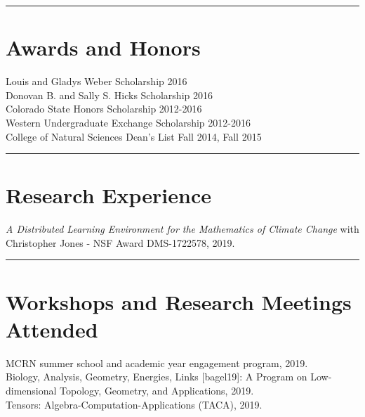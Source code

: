 \documentclass[12pt]{article} %
\begin{document}
\rule{\textwidth}{0.5mm}


\section{Awards and Honors}
\begin{flushleft}
Louis and Gladys Weber Scholarship \hfill 2016\\
\vspace*{5pt}
Donovan B. and Sally S. Hicks Scholarship \hfill 2016\\
\vspace*{5pt}
Colorado State Honors Scholarship \hfill 2012-2016\\
\vspace*{5pt}
Western Undergraduate Exchange Scholarship \hfill 2012-2016\\
\vspace*{5pt}
College of Natural Sciences Dean's List \hfill Fall 2014, Fall 2015\\
\vspace*{5pt}
\end{flushleft}
\rule{\textwidth}{0.5mm}

\section{Research Experience}
\begin{flushleft}
    \emph{A Distributed Learning Environment for the Mathematics of Climate Change} with Christopher Jones - NSF Award DMS-1722578, 2019.
\end{flushleft}
\rule{\textwidth}{0.5mm}

\section{Workshops and Research Meetings Attended}

\begin{flushleft}
MCRN summer school and academic year engagement program, 2019.\\
\vspace*{5pt}
Biology, Analysis, Geometry, Energies, Links [bagel19]: A Program on Low-dimensional Topology, Geometry, and Applications, 2019.\\
\vspace*{5pt}
Tensors: Algebra-Computation-Applications (TACA), 2019.\\
\end{flushleft}
\end{document}
